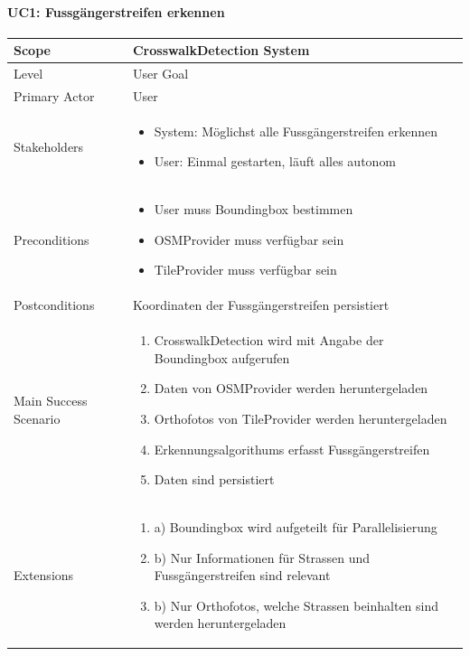 \paragraph{UC1: Fussgängerstreifen erkennen}
\begin{table}
    \begin{tabular}{ | p{3cm} | p{9cm}  | }
    \hline
    Scope & CrosswalkDetection System   \\ \hline
	Level  & User Goal \\ \hline
	Primary Actor & User \\ \hline 
	Stakeholders & 
	\begin{itemize}
		\item System: Möglichst alle Fussgängerstreifen erkennen
		\item User: Einmal gestarten, läuft alles autonom
    \end{itemize} \\ \hline
	Preconditions & 
		\begin{itemize}
		\item User muss Boundingbox bestimmen
		\item OSMProvider muss verfügbar sein
		\item TileProvider muss verfügbar sein
    \end{itemize} \\ \hline
	Postconditions & Koordinaten der Fussgängerstreifen persistiert \\ \hline
	Main Success Scenario & 
	\begin{enumerate}
		\item CrosswalkDetection wird mit Angabe der Boundingbox aufgerufen
		\item Daten von OSMProvider werden heruntergeladen
		\item Orthofotos von TileProvider werden heruntergeladen
		\item Erkennungsalgorithums erfasst Fussgängerstreifen
		\item Daten sind persistiert
	\end{enumerate} \\ \hline
	Extensions & 
	\begin{enumerate}
		\item a) Boundingbox wird aufgeteilt für Parallelisierung
		\item b) Nur Informationen für Strassen und Fussgängerstreifen sind relevant
		\item b) Nur Orthofotos, welche Strassen beinhalten sind werden heruntergeladen
	\end{enumerate} \\ \hline

\end{tabular}
\end{table}
